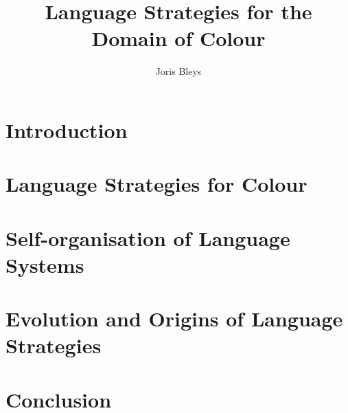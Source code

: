 \documentclass[ number=3
			   ,series=cmle
			   ,url=http://langsci-press.org/ 
			   ,isbn=978-3-944675-44-2
			   ,output=long   %
			  ]{LSP/langsci}
\title{Language Strategies for the Domain of Colour}
\author{Joris Bleys}
\begin{document}
 

\maketitle  

\frontmatter


\tableofcontents    
\mainmatter

\part{Introduction}



\part{Language Strategies for Colour}
\label{s:language-strats}







\part{Self-organisation of Language Systems}
\label{s:evolution-of-language-systems}






\part{Evolution and Origins of Language Strategies}
\label{s:evolution-of-language-strategies}





\part{Conclusion}
\label{s:conclusion}



\appendix




\backmatter   





                              
\end{document}
